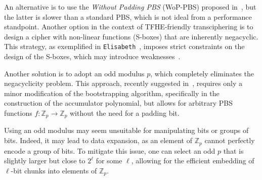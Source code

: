 An alternative is to use the \emph{Without Padding PBS} (WoP-PBS) proposed in~\cite{AC:CLOT21}, but the latter is slower than a standard PBS, which is not ideal from a performance standpoint. Another option in the context of TFHE-friendly transciphering is to design a cipher with non-linear functions (S-boxes) that are inherently negacyclic. This strategy, as exemplified in \texttt{Elisabeth}~\cite{AC:CHMS22}, imposes strict constraints on the design of the S-boxes, which may introduce weaknesses~\cite{AC:GBJR23}. 

Another solution is to adopt an odd modulus $p$, which completely eliminates the negacyclicity problem. This approach, recently suggested in~\cite{BPR24}, requires only a minor modification of the bootstrapping algorithm, specifically in the construction of the accumulator polynomial, but allows for arbitrary PBS functions $f:\mathbb{Z}_p \to \mathbb{Z}_p$ without the need for a padding bit. 


Using an odd modulus may seem unsuitable for manipulating bits or groups of bits. Indeed, it may lead to data expansion, as an element of \( \mathbb{Z}_p \) cannot perfectly encode a group of bits. To mitigate this issue, one can select an odd $p$ that is slightly larger but close to $2^\ell$ for some $\ell$, allowing for the efficient embedding of $\ell$-bit chunks into elements of $\mathbb{Z}_p$. 


